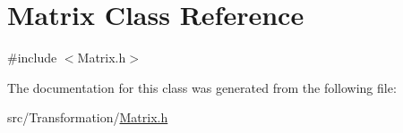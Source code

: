 \hypertarget{class_matrix}{}\section{Matrix Class Reference}
\label{class_matrix}


{\ttfamily \#include $<$Matrix.\+h$>$}



The documentation for this class was generated from the following file\+:\begin{DoxyCompactItemize}
\item 
src/\+Transformation/\mbox{\hyperlink{_matrix_8h}{Matrix.\+h}}\end{DoxyCompactItemize}
